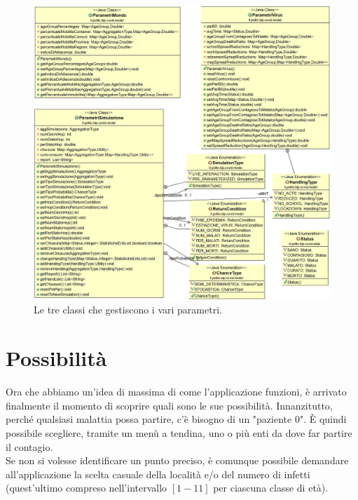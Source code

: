 \documentclass[a4paper, 12pt]{article}
\begin{document}
		\begin{figure}[H]
			\centering
			\includegraphics[width=\linewidth]{IMG/parametri.png}
			\caption[UML parametri]{Le tre classi che gestiscono i vari parametri.}
			\label{fig:UMLpar}
		\end{figure}

		
\newpage

\section{Possibilità}
	Ora che abbiamo un'idea di massima di come l'applicazione funzioni, è arrivato finalmente il momento di scoprire quali sono le sue possibilità.		
	Innanzitutto, perché qualsiasi malattia possa partire, c'è bisogno di un "paziente 0".
	È quindi possibile scegliere, tramite un menù a tendina, uno o più enti da dove far partire il contagio.\\
	Se non si volesse identificare un punto preciso, è comunque possibile demandare all'applicazione la scelta casuale della località e/o del numero di infetti (quest'ultimo compreso nell'intervallo $[1-11]$ per ciascuna classe di età).
	
\end{document}
